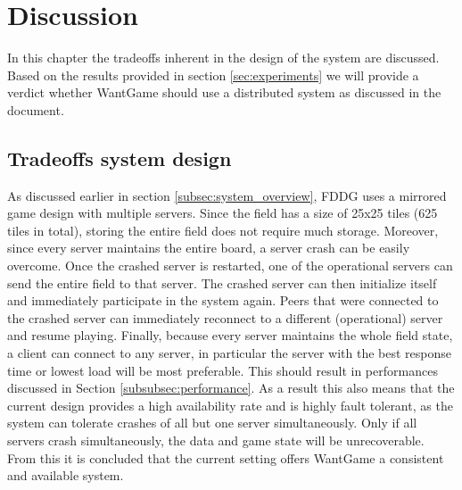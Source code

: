 \section{Discussion}
\label{sec:discussion}


	In this chapter the tradeoffs inherent in the design of the system are discussed. Based on the results provided in section \ref{sec:experiments} we will provide a verdict whether WantGame should use a distributed system as discussed in the document.
	
	
	\subsection{Tradeoffs system design}
	\label{subsec:tradeoffs_system_design}
		As discussed earlier in section \ref{subsec:system_overview}, FDDG uses a mirrored game design with multiple servers. 
		Since the field has a size of 25x25 tiles (625 tiles in total), storing the entire field does not require much storage. 
		Moreover, since every server maintains the entire board, a server crash can be easily overcome.
		Once the crashed server is restarted, one of the operational servers can send the entire field to that server. 
		The crashed server can then initialize itself and immediately participate in the system again. 
		Peers that were connected to the crashed server can immediately reconnect to a different (operational) server and resume playing.
		Finally, because every server maintains the whole field state, a client can connect to any server, in particular the server with the best response time or lowest load will be most preferable.
		This should result in performances discussed in Section \ref{subsubsec:performance}.
		As a result this also means that the current design provides a high availability rate and is highly fault tolerant, as the system can tolerate crashes of all but one server simultaneously. 
		Only if all servers crash simultaneously, the data and game state will be unrecoverable.
		From this it is concluded that the current setting offers WantGame a consistent and available system. 
		
